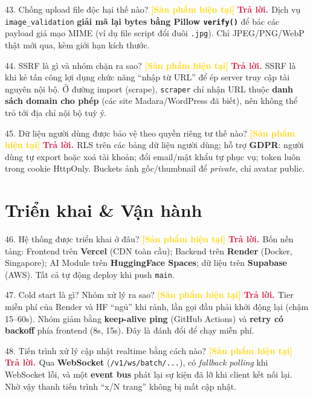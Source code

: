 \documentclass[11pt]{article}
\newcommand{\tagSP}{\textcolor{gold}{\footnotesize\textbf{[Sản phẩm hiện tại]}}}
\newcommand{\A}{\textbf{\textcolor{crimson}{Trả lời. }}}
\begin{document}
\begin{qa}{43. Chống upload file độc hại thế nào? \tagSP}
\A Dịch vụ \texttt{image\_validation} \textbf{giải mã lại bytes bằng Pillow \texttt{verify()}} để bác các payload giả mạo MIME (ví dụ file script đổi đuôi \texttt{.jpg}). Chỉ JPEG/PNG/WebP thật mới qua, kèm giới hạn kích thước.
\end{qa}

\begin{qa}{44. SSRF là gì và nhóm chặn ra sao? \tagSP}
\A SSRF là khi kẻ tấn công lợi dụng chức năng ``nhập từ URL'' để ép server truy cập tài nguyên nội bộ. Ở đường import (scrape), \texttt{scraper} chỉ nhận URL thuộc \textbf{danh sách domain cho phép} (các site Madara/WordPress đã biết), nên không thể trỏ tới địa chỉ nội bộ tuỳ ý.
\end{qa}

\begin{qa}{45. Dữ liệu người dùng được bảo vệ theo quyền riêng tư thế nào? \tagSP}
\A RLS trên các bảng dữ liệu người dùng; hỗ trợ \textbf{GDPR}: người dùng tự export hoặc xoá tài khoản; đổi email/mật khẩu tự phục vụ; token luôn trong cookie HttpOnly. Buckets ảnh gốc/thumbnail để \textit{private}, chỉ avatar public.
\end{qa}

\section{Triển khai \& Vận hành}

\begin{qa}{46. Hệ thống được triển khai ở đâu? \tagSP}
\A Bốn nền tảng: Frontend trên \textbf{Vercel} (CDN toàn cầu); Backend trên \textbf{Render} (Docker, Singapore); AI Module trên \textbf{HuggingFace Spaces}; dữ liệu trên \textbf{Supabase} (AWS). Tất cả tự động deploy khi push \texttt{main}.
\end{qa}

\begin{qa}{47. Cold start là gì? Nhóm xử lý ra sao? \tagSP}
\A Tier miễn phí của Render và HF ``ngủ'' khi rảnh, lần gọi đầu phải khởi động lại (chậm 15--60s). Nhóm giảm bằng \textbf{keep-alive ping} (GitHub Actions) và \textbf{retry có backoff} phía frontend (8s, 15s). Đây là đánh đổi để chạy miễn phí.
\end{qa}

\begin{qa}{48. Tiến trình xử lý cập nhật realtime bằng cách nào? \tagSP}
\A Qua \textbf{WebSocket} (\texttt{/v1/ws/batch/...}), có \textit{fallback polling} khi WebSocket lỗi, và một \textbf{event bus} phát lại sự kiện đã lỡ khi client kết nối lại. Nhờ vậy thanh tiến trình ``x/N trang'' không bị mất cập nhật.
\end{qa}
\end{document}
